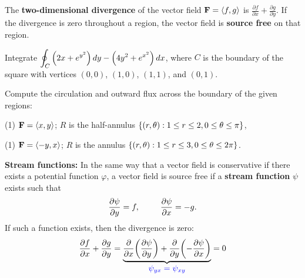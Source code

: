 \documentclass[mathNotesPreamble]{subfiles}
\begin{document}
  \begin{defn*}
    The \textbf{two-dimensional divergence} of the vector field $\mathbf F={\left\langle f,g \right\rangle}$ is $\displaystyle \frac{\partial f}{\partial x}+\frac{\partial g}{\partial y}$. If the divergence is zero throughout a region, the vector field is \textbf{source free} on that region.
  \end{defn*}
  \pagebreak


  \begin{ex*}
    Integrate $\displaystyle \oint_C {\left(2x+e^{y^2}\right)}\,dy-{\left(4y^2+e^{x^2}\right)}\,dx$, where $C$ is the boundary of the square with vertices $(0,0)$, $(1,0)$, $(1,1)$, and $(0,1)$.
  \end{ex*}
  \pagebreak

  \begin{ex*}
    Compute the circulation and outward flux across the boundary of the given regions:
  \end{ex*}
  \begin{tasks}[after-item-skip=\stretch{1}, label=](1)
    \task $\mathbf F={\left\langle x,y \right\rangle}$; $R$ is the half-annulus ${\left\{(r,\theta): 1\leq r\leq 2, 0\leq \theta\leq \pi\right\}}$,
  \end{tasks}
  \pagebreak

  \begin{tasks}[after-item-skip=\stretch{1}, label=, resume](1)
    \task $\mathbf F={\left\langle -y,x \right\rangle}$; $R$ is the annulus ${\left\{(r,\theta): 1\leq r\leq 3, 0\leq \theta\leq 2\pi\right\}}$.
  \end{tasks}
  \pagebreak

  \textbf{Stream functions:}\newline
  In the same way that a vector field is conservative if there exists a potential function $\varphi$, a vector field is source free if a \textbf{stream function} $\psi$ exists such that
    \[\frac{\partial \psi}{\partial y}=f, \hspace*{25pt} \frac{\partial \psi}{\partial x}=-g.\]
  If such a function exists, then the divergence is zero:
    \[\frac{\partial f}{\partial x}+\frac{\partial g}{\partial y}=\underbrace{\frac{\partial}{\partial x}{\left(\frac{\partial \psi}{\partial y}\right)}+\frac{\partial}{\partial y}{\left(-\frac{\partial \psi}{\partial x}\right)}}_{\textcolor{blue}{\displaystyle\psi_{yx}=\psi_{xy}}}=0\]
\end{document}
